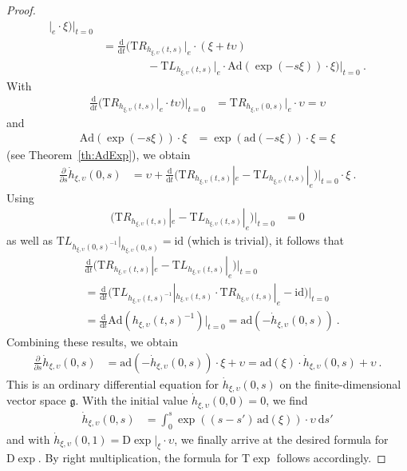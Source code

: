 \documentclass[10pt,a4paper]{article}
\theoremstyle{mytheorem}
\theoremstyle{mydefinition}
\newcommand{\dt}{\mathrm{d}}
\newcommand{\Dt}{\mathrm{D}}
\newcommand{\Tt}{\mathrm{T}}
\newcommand{\ad}{\mathrm{ad}}
\newcommand{\Ad}{\mathrm{Ad}}
\begin{document}
\begin{proof}
\begin{align*}
		|_e
		\cdot
		\xi
	\Big)	
	\Big|_{t=0}
	\nonumber\\	
	&=
	\frac{\dt}{\dt t}	
	\Big(
		\Tt R_{h_{\xi, \upsilon}(t, s)}
		|_e
		\cdot
		(\xi + t\upsilon)
	\nonumber\\
	&\qquad\qquad-
		\Tt L_{h_{\xi, \upsilon}(t, s)}
		|_{e}	
		\cdot
		\Ad(\exp(-s\xi))
		\cdot
		\xi
	\Big)	
	\Big|_{t=0}
	\ .
\end{align*}
With
\begin{align*}
	\frac{\dt}{\dt t}	
	\Big(
		\Tt R_{h_{\xi, \upsilon}(t, s)}
		|_e
		\cdot
		t\upsilon
	\Big)
	\Big|_{t=0}
	&=
	\Tt R_{h_{\xi, \upsilon}(0, s)}
	|_e
	\cdot
	\upsilon
	= \upsilon
\end{align*}
and
\begin{align*}
	\Ad(\exp(-s\xi))\cdot\xi
	&= \exp(\ad(-s\xi))\cdot\xi
	= \xi
\end{align*}
(see Theorem~\ref{th:AdExp}), we obtain
\begin{align*}
	\frac{\partial}{\partial s}
	\dot{h}_{\xi, \upsilon}(0, s)	
	&=
	\upsilon +
	\frac{\dt}{\dt t}		
	\Big(
		\Tt R_{h_{\xi, \upsilon}(t, s)}
		|_e -
		\Tt L_{h_{\xi, \upsilon}(t, s)}
		|_{e}
	\Big)
	\Big|_{t=0}
	\cdot\xi
	\ .
\end{align*}
Using
\begin{align*}
	\big(
	\Tt R_{h_{\xi, \upsilon}(t, s)}
	|_e -
	\Tt L_{h_{\xi, \upsilon}(t, s)}
	|_{e}
	\big)\big|_{t=0}
	&= 0
\end{align*}
as well as $\Tt L_{h_{\xi, \upsilon}(0, s)^{-1}}|_{h_{\xi, \upsilon}(0, s)}=\mathrm{id}$ (which is trivial), it follows that
\begin{align*}
	&\frac{\dt}{\dt t}	
	\Big(
		\Tt R_{h_{\xi, \upsilon}(t, s)}
		|_e -
		\Tt L_{h_{\xi, \upsilon}(t, s)}
		|_{e}	
	\Big)	
	\Big|_{t=0}
	\nonumber\\
	&=
	\frac{\dt}{\dt t}
	\big(
		\Tt L_{h_{\xi, \upsilon}(t, s)^{-1}}
		|_{h_{\xi, \upsilon}(t, s)} \cdot
		\Tt R_{h_{\xi, \upsilon}(t, s)}
		|_e -
		\mathrm{id}	
	\big)
	\Big|_{t=0}
	\nonumber\\
	&=
	\frac{\dt}{\dt t}
		\Ad(h_{\xi, \upsilon}(t, s)^{-1})
	\Big|_{t=0}
	= \ad(-\dot{h}_{\xi, \upsilon}(0, s))
	\ .
\end{align*}
Combining these results, we obtain
\begin{align*}
	\frac{\partial}{\partial s}
	\dot{h}_{\xi, \upsilon}(0, s)
	&=
	\ad(-\dot{h}_{\xi, \upsilon}(0, s))\cdot\xi + \upsilon
	= \ad(\xi)\cdot\dot{h}_{\xi, \upsilon}(0, s) + \upsilon
	\ .
\end{align*}
This is an ordinary differential equation for $\dot{h}_{\xi, \upsilon}(0, s)$ on the finite-dimensional vector space $\mathfrak{g}$.
With the initial value $\dot{h}_{\xi, \upsilon}(0, 0)=0$, we find
\begin{align*}
	\dot{h}_{\xi, \upsilon}(0, s)
	&=
	\int_0^s
	\exp((s-s')\,\ad(\xi))\cdot{\upsilon}
	\ \dt s'
\end{align*}
and with $\dot{h}_{\xi, \upsilon}(0, 1)=\Dt\exp|_{\xi}\cdot\upsilon$, we finally arrive at the desired formula for $\Dt\exp$.
By right multiplication, the formula for $\Tt\exp$ follows accordingly.
\end{proof}
\end{document}
